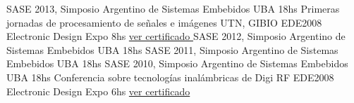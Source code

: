 \documentclass[11pt,a4paper,sans]{moderncv}  %
\begin{document}
 { SASE 2013, Simposio Argentino de Sistemas Embebidos                              } { UBA                                       } { 18hs                                                               } { }                                                                                               { }                                                                                                                 { }
 { Primeras jornadas de procesamiento de señales e imágenes                         } { UTN, GIBIO EDE2008 Electronic Design Expo } { 8hs                                                                } { \href                                                                                           { http://disenioconingenio.com.ar/producto.php?products_id=396                            }                         { ver certificado }  } { } { }
 { SASE 2012, Simposio Argentino de Sistemas Embebidos                              } { UBA                                       } { 18hs                                                               } { }                                                                                               { }                                                                                                                 { }
 { SASE 2011, Simposio Argentino de Sistemas Embebidos                              } { UBA                                       } { 18hs                                                               } { }                                                                                               { }                                                                                                                 { }
 { SASE 2010, Simposio Argentino de Sistemas Embebidos                              } { UBA                                       } { 18hs                                                               } { }                                                                                               { }                                                                                                                 { }
 { Conferencia sobre tecnologías inalámbricas de Digi RF                            } { EDE2008 Electronic Design Expo            } { 6hs                                                                } { \href                                                                                           { http://disenioconingenio.com.ar/producto.php?products_id=394                            }                         { ver certificado }  } { } { }
\end{document}
